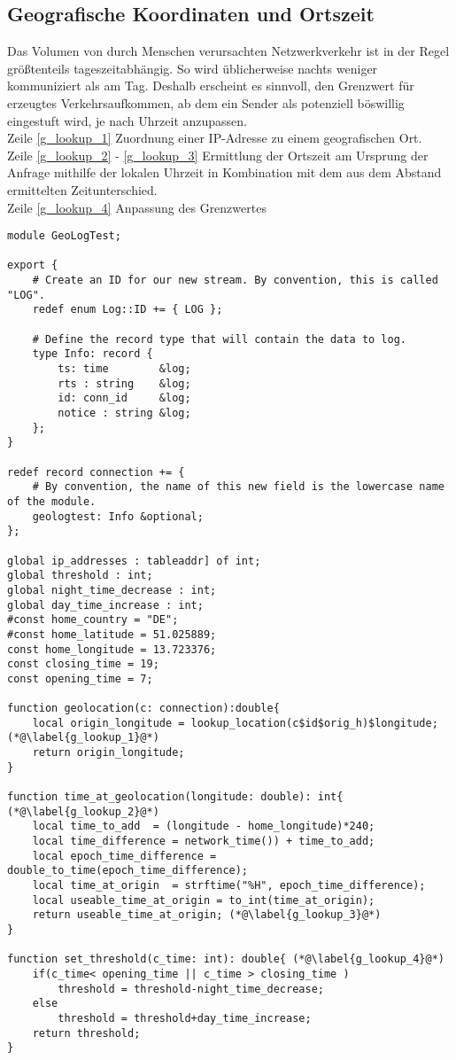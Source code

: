 \subsection{Geografische Koordinaten und Ortszeit}
Das Volumen von durch Menschen verursachten Netzwerkverkehr ist in der Regel größtenteils tageszeitabhängig. So wird üblicherweise nachts weniger kommuniziert als am Tag. Deshalb erscheint es sinnvoll, den Grenzwert für erzeugtes Verkehrsaufkommen, ab dem ein Sender als potenziell böswillig eingestuft wird, je nach Uhrzeit anzupassen.\\
Zeile \ref{g_lookup_1} Zuordnung einer IP-Adresse zu einem geografischen Ort.\\
Zeile \ref{g_lookup_2} - \ref{g_lookup_3} Ermittlung der Ortszeit am Ursprung der Anfrage mithilfe der lokalen Uhrzeit in Kombination mit dem aus dem Abstand ermittelten Zeitunterschied.\\
Zeile \ref{g_lookup_4} Anpassung des Grenzwertes\\
\begin{lstlisting}[consecutivenumbers=false,numberblanklines=false,label={Code_3},caption={Geolokalisierung und Setzen des Grenzwertes},firstnumber=31,linerange={31-37,42-54}]
module GeoLogTest;

export {
    # Create an ID for our new stream. By convention, this is called "LOG".
    redef enum Log::ID += { LOG };

    # Define the record type that will contain the data to log.
    type Info: record {
        ts: time        &log;
        rts : string 	&log;
        id: conn_id     &log; 
        notice : string &log;
    };
}

redef record connection += {
    # By convention, the name of this new field is the lowercase name of the module.
    geologtest: Info &optional;
};

global ip_addresses : tableaddr] of int;
global threshold : int; 
global night_time_decrease : int;
global day_time_increase : int;
#const home_country = "DE";
#const home_latitude = 51.025889;
const home_longitude = 13.723376;
const closing_time = 19;
const opening_time = 7;

function geolocation(c: connection):double{
	local origin_longitude = lookup_location(c$id$orig_h)$longitude;(*@\label{g_lookup_1}@*)
	return origin_longitude;
}

function time_at_geolocation(longitude: double): int{ (*@\label{g_lookup_2}@*)
	local time_to_add  = (longitude - home_longitude)*240;
	local time_difference = network_time()) + time_to_add;
	local epoch_time_difference = double_to_time(epoch_time_difference);
	local time_at_origin  = strftime("%H", epoch_time_difference);
	local useable_time_at_origin = to_int(time_at_origin);
	return useable_time_at_origin; (*@\label{g_lookup_3}@*)
}

function set_threshold(c_time: int): double{ (*@\label{g_lookup_4}@*)
	if(c_time< opening_time || c_time > closing_time )
		threshold = threshold-night_time_decrease;
	else 
		threshold = threshold+day_time_increase;
	return threshold; 
}
\end{lstlisting}

